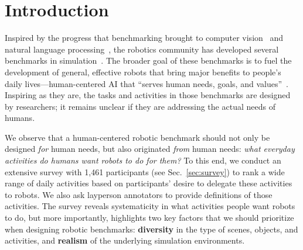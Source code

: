 \section{Introduction}
\label{s:intro}

Inspired by the progress that benchmarking brought to computer vision~\cite{deng2009imagenet,lin2014microsoft,everingham2010pascal,krishna2017visual,geiger2012we,goyal2017something,sigurdsson2018actor,xiang2017posecnn,martin2021jrdb,caba2015activitynet,gurari2018vizwiz} and natural language processing~\cite{marcinkiewicz1994building,wang2018glue,rajpurkar2016squad,socher2013recursive,antol2015vqa}, the robotics community has developed several benchmarks in simulation~\cite{batra2020rearrangement,weihs2021visual,gan2021threedworld,puig2018virtualhome,shridhar2020alfred,xia2020interactive,yu2020meta,james2019rlbench,savva2019habitat,szot2021habitat,srivastava2021behavior,zhu2020robosuite,tassa2018deepmind,brockman2016openai}.
The broader goal of these benchmarks is to fuel the development of general, effective robots that bring major benefits to people's daily lives---human-centered AI that ``serves human needs, goals, and values''~\cite{littman2021gathering, riedl2019human, xu2019toward,shneiderman2020bridging}. Inspiring as they are, the tasks and activities in those benchmarks are designed by researchers; it remains unclear if they are addressing the actual needs of humans. %

We observe that a human-centered robotic benchmark should not only be designed \emph{for} human needs, but also originated \emph{from} human needs: \textit{what everyday activities do humans want robots to do for them?} %
To this end, we conduct an extensive survey with 1,461 participants (see Sec.~\ref{sec:survey}) to rank a wide range of daily activities based on participants' desire to delegate these activities to robots. We also ask layperson annotators to provide definitions of those activities. The survey reveals systematicity in what activities people want robots to do, but more importantly, highlights two key factors that we should prioritize when designing robotic benchmarks: \textbf{diversity} in the type of scenes, objects, and activities, and \textbf{realism} of the underlying simulation environments. %

